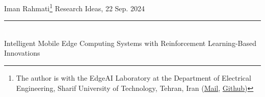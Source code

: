 \documentclass[12pt]{article}
\newcommand{\soptitle}{Intelligent Mobile Edge Computing Systems with Reinforcement Learning-Based Innovations}
\newcommand{\yourname}{Iman Rahmati}
\begin{document}
	

	
%

\begin{center} 
	
	\vspace{-17mm}
	
	\large Iman Rahmati\footnote{The author is with the EdgeAI Laboratory at the Department of Electrical Engineering, Sharif University of Technology, Tehran, Iran (\href{mailto:iman.rahmati@sharif.edu}{Mail}, \href{https://github.com/ImanRHT}{Github})} \hfill Research Ideas, 22 Sep. 2024 \vspace{1mm} \hrule
	
	\vspace{-5mm}
	
	
	\noindent\Large 
	\textcolor{white}{i} \\ \LARGE\soptitle \vspace{6mm}\\
\end{center}






\vspace{-8mm}

\begin{abstract}
	\noindent
	Mobile edge computing often suffers from the dynamic and unknown nature of the environment, such as time-varying conditions, heterogeneous devices, and frequent communication requests, imposing significant challenges on improving system performance. To meet the rapidly growing demands of computation-intensive and time-sensitive applications, Reinforcement learning (RL)\cite{mnih2015human} has been proposed as an effective tool to establish low-latency and energy-efficient networks. RL enables network entities to interact with the environment and learn an optimal decision-making policy, usually modeled as a Markov decision process (MDP)\cite{puterman2014markov}.\vspace{2mm}
	
	\noindent\textit{\textbf{Terms—}} Mobile edge computing (MEC), Resource Management, Computation Offloading, Partially Observable MDP (POMDP), Deep RL (DRL), Multi-Agent RL (MARL), Meta RL, Federated RL
\end{abstract}
\end{document}
